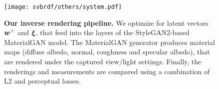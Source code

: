 \begin{figure}[h]
	\centering
	\texttt{[image: svbrdf/others/system.pdf]}
	\caption[Inverse rendering pipeline]{\label{fig:svbrdf:framework}
		\textbf{Our inverse rendering pipeline.} We optimize for latent vectors $\bm{w}^+$ and $\bm\xi$, that feed into the layers of the StyleGAN2-based MaterialGAN model. 
		The MaterialGAN generator produces material maps (diffuse albedo, normal, roughness and specular albedo), that are rendered under the captured view/light settings. 
		Finally, the renderings and measurements are compared using a combination of L2 and perceptual losses.
	}
\end{figure}
